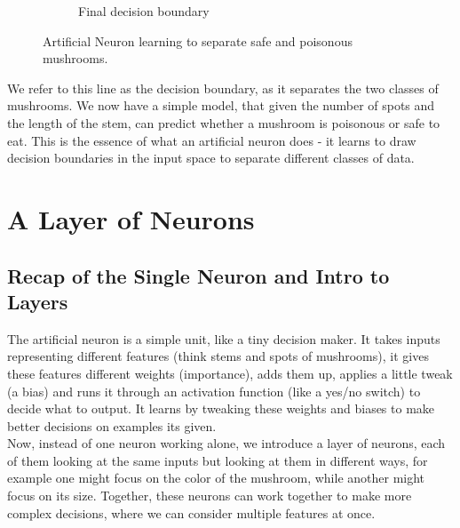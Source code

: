 \documentclass[9pt]{extarticle}
\theoremstyle{plain}
\theoremstyle{definition}
\theoremstyle{remark}
\begin{document}
\begin{figure}[h]
\begin{subfigure}{0.3\textwidth}
        \caption{Final decision boundary}
    \end{subfigure}
    \caption{Artificial Neuron learning to separate safe and poisonous mushrooms.}
\end{figure}
We refer to this line as the decision boundary, as it separates the two classes of mushrooms. We now have a simple model, that given the number of spots and the length of the stem, can predict whether a mushroom is poisonous or safe to eat. This is the essence of what an artificial neuron does - it learns to draw decision boundaries in the input space to separate different classes of data.

\pagebreak

\section{A Layer of Neurons}
\subsection{Recap of the Single Neuron and Intro to Layers}
The artificial neuron is a simple unit, like a tiny decision maker. It takes inputs representing different features (think stems and spots of mushrooms), it gives these features different weights (importance), adds them up, applies a little tweak (a bias) and runs it through an activation function (like a yes/no switch) to decide what to output. It learns by tweaking these weights and biases to make better decisions on examples its given. \\ [2ex]
Now, instead of one neuron working alone, we introduce a layer of neurons, each of them looking at the same inputs but looking at them in different ways, for example one might focus on the color of the mushroom, while another might focus on its size. Together, these neurons can work together to make more complex decisions, where we can consider multiple features at once.
\end{document}
